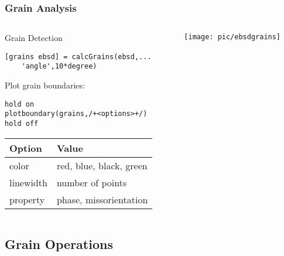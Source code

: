 \documentclass[compress]{beamer}
\begin{document}
\begin{frame}[fragile]
  \frametitle{Grain Analysis}

  \begin{columns}
    \begin{column}{8.5cm}

      \medskip

      Grain Detection

\begin{lstlisting}
[grains ebsd] = calcGrains(ebsd,...
    'angle',10*degree)
\end{lstlisting}


\medskip

\pause

Plot grain boundaries:
\begin{lstlisting}
hold on
plotboundary(grains,/+<options>+/)
hold off
\end{lstlisting}

\begin{tabular}{ll}
  Option & Value \\
  \toprule
  color & red, blue, black, green\\
  linewidth & number of points\\
  property & phase, missorientation\\
\end{tabular}

\end{column}

\begin{column}{3.5cm}
  \texttt{[image: pic/ebsdgrains]}
\end{column}
\end{columns}

\end{frame}


\subsection*{Grain Operations}
\end{document}
